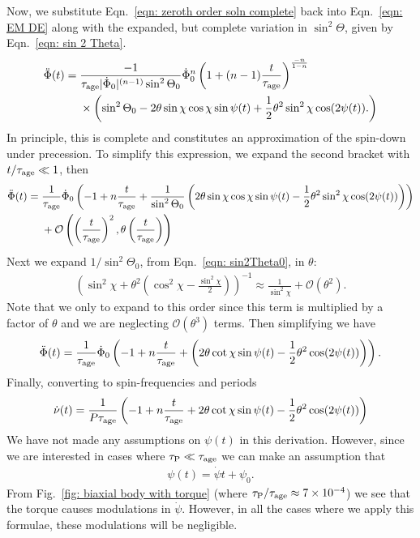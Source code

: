 \documentclass[../full_thesis/full_thesis.tex]{subfiles}
\begin{document}
Now, we substitute Eqn.~\eqref{eqn: zeroth order soln complete} back into
Eqn.~\eqref{eqn: EM DE} along with the expanded, but complete variation in
$\sin^{2}\Theta$, given by Eqn.~\eqref{eqn: sin 2 Theta}.
\begin{align}
\begin{split}
\ddot{\Phi}(t)  = {} & \frac{-1}{\tau_{\mathrm{age}} |\dot{\Phi}_0|^{(n-1)} \sin^{2}\Theta_0}
\dot{\Phi}_0^n\left(1 + (n-1)\frac{t}{\tau_{\mathrm{age}}}\right)^{\frac{-n}{1-n}} \\
& \times \left(\sin^{2}\Theta_0
- 2\theta \sin\chi\cos\chi \sin\psi(t)
 + \frac{1}{2}\theta^{2}\sin^{2}\chi\cos(2\psi(t)).
\right)
\end{split}
\end{align}
In principle, this is complete and constitutes an approximation of the spin-down
under precession.
To simplify this expression, we expand the second bracket with $t/\tau_{\mathrm{age}}\ll1$, then
\begin{align}
\begin{split}
\ddot{\Phi}(t) = {} & \frac{1}{\tau_{\mathrm{age}}} \dot{\Phi}_0
\left(-1 + n\frac{t}{\tau_{\mathrm{age}}} +
\frac{1}{\sin^{2}\Theta_0}\left(
2\theta \sin\chi\cos\chi \sin\psi(t)
- \frac{1}{2}\theta^{2}\sin^{2}\chi\cos(2\psi(t))
\right)\right) \\
& +
\mathcal{O}\left(\left(\frac{t}{\tau_{\mathrm{age}}}\right)^{2},
                 \theta\left(\frac{t}{\tau_{\mathrm{age}}}\right)\right)
\end{split}
\end{align}
Next we expand $1/\sin^{2}\Theta_0$, from Eqn.~\eqref{eqn: sin2Theta0}, in $\theta$:
\begin{align}
\left(\sin^{2}\chi + \theta^{2}\left(\cos^{2}\chi - \frac{\sin^{2}\chi}{2}\right)\right)^{-1}
\approx
\frac{1}{\sin^{2}\chi} + \mathcal{O}(\theta^{2}).
\end{align}
Note that we only to expand to this order since this term is multiplied by a
factor of $\theta$ and we are neglecting $\mathcal{O}(\theta^{3})$ terms.
Then simplifying we have
\begin{align}
\ddot{\Phi}(t) = \frac{1}{\tau_{\mathrm{age}}} \dot{\Phi}_0
\left(-1 + n \frac{t}{\tau_{\mathrm{age}}} +
\left( 2\theta \cot\chi \sin\psi(t)
- \frac{1}{2}\theta^{2}\cos(2\psi(t))
\right)\right).
\end{align}
Finally, converting to spin-frequencies and periods
\begin{align}
\dot{\nu}(t) = \frac{1}{P\tau_{\mathrm{age}}}
\left(-1 + n \frac{t}{\tau_{\mathrm{age}}} +
2\theta \cot\chi \sin\psi(t)
- \frac{1}{2}\theta^{2}\cos(2\psi(t))
\right)
\label{eqn: spin-down rate}
\end{align}
We have not made any assumptions on $\psi(t)$ in this derivation. However, since
we are interested in cases where $\tau_{\mathrm{P}} \ll \tau_{\mathrm{age}}$ we can make an assumption
that
\begin{align}
\psi(t) = \dot{\psi} t + \psi_0.
\end{align}
From Fig.~\ref{fig: biaxial body with torque} (where $\tau_{\mathrm{P}}/\tau_{\mathrm{age}} \approx
7\times10^{-4}$) we see that the torque causes modulations in $\dot{\psi}$.
However, in all the cases where we apply this formulae, these modulations will
be negligible.
\end{document}
